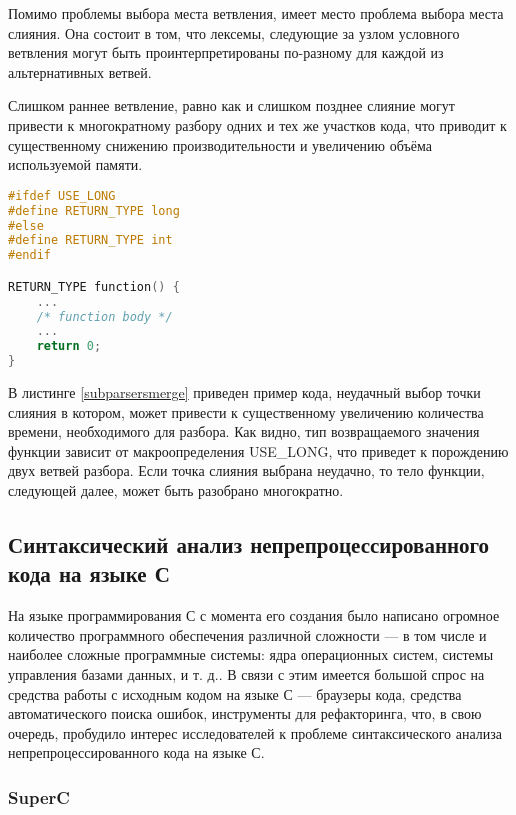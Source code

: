 Помимо проблемы выбора места ветвления, имеет место проблема выбора места слияния. Она состоит в том, что лексемы, следующие за узлом условного ветвления могут быть проинтерпретированы по-разному для каждой из альтернативных ветвей.

Слишком раннее ветвление, равно как и слишком позднее слияние могут привести к многократному разбору одних и тех же участков кода, что приводит к существенному снижению производительности и увеличению объёма используемой памяти.

\begin{minipage}{\linewidth}
\begin{lstlisting}[caption={Выбор точки слияния подпарсеров оказывает существенное влияние на скорость разбора},label=subparsersmerge,language=C]
#ifdef USE_LONG
#define RETURN_TYPE long
#else
#define RETURN_TYPE int
#endif

RETURN_TYPE function() {
	...
	/* function body */	
	...	
	return 0;
}
\end{lstlisting}
\end{minipage}

В листинге \ref{subparsersmerge} приведен пример кода, неудачный выбор точки слияния в котором, может привести к существенному увеличению количества времени, необходимого для разбора. Как видно, тип возвращаемого значения функции зависит от макроопределения USE\_LONG, что приведет к порождению двух ветвей разбора. Если точка слияния выбрана неудачно, то тело функции, следующей далее, может быть разобрано многократно.

\subsection{Синтаксический анализ непрепроцессированного кода на языке С}

На языке программирования С с момента его создания было написано огромное количество программного обеспечения различной сложности --- в том числе и наиболее сложные программные системы: ядра операционных систем, системы управления базами данных, и т. д.. В связи с этим имеется большой спрос на средства работы с исходным кодом на языке С --- браузеры кода, средства автоматического поиска ошибок, инструменты для рефакторинга, что, в свою очередь, пробудило интерес исследователей к проблеме синтаксического анализа непрепроцессированного кода на языке С.

\subsubsection{SuperC}

